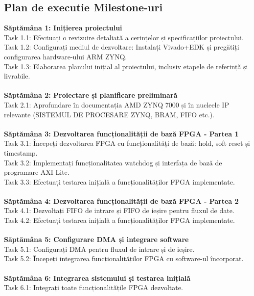 \documentclass[12pt]{article}
\begin{document}
\subsection{Plan de executie Milestone-uri}
\textbf{Săptămâna 1: Inițierea proiectului}\\
Task 1.1: Efectuați o revizuire detaliată a cerințelor și specificațiilor proiectului.\\
Task 1.2: Configurați mediul de dezvoltare: Instalați Vivado+EDK și pregătiți configurarea hardware-ului ARM ZYNQ.\\
Task 1.3: Elaborarea planului inițial al proiectului, inclusiv etapele de referință și livrabile.\\\\
\textbf{Săptămâna 2: Proiectare și planificare preliminară}\\
Task 2.1: Aprofundare în documentația AMD ZYNQ 7000 și în nucleele IP relevante (SISTEMUL DE PROCESARE ZYNQ, BRAM, FIFO etc.).\\\\
\textbf{Săptămâna 3: Dezvoltarea funcționalității de bază FPGA - Partea 1}\\
Task 3.1: Începeți dezvoltarea FPGA cu funcționalități de bază: hold, soft reset și timestamp.\\
Task 3.2: Implementați funcționalitatea watchdog și interfața de bază de programare AXI Lite.\\
Task 3.3: Efectuați testarea inițială a funcționalităților FPGA implementate.\\\\
\textbf{Săptămâna 4: Dezvoltarea funcționalității de bază FPGA - Partea 2}\\
Task 4.1: Dezvoltați FIFO de intrare și FIFO de ieșire pentru fluxul de date.\\
Task 4.2: Efectuați testarea inițială a funcționalităților FPGA implementate.\\\\
\textbf{Săptămâna 5: Configurare DMA și integrare software}\\
Task 5.1: Configurați DMA pentru fluxul de intrare și de ieșire.\\
Task 5.2: Începeți integrarea funcționalităților FPGA cu software-ul încorporat.\\\\
\textbf{Săptămâna 6: Integrarea sistemului și testarea inițială}\\
Task 6.1: Integrați toate funcționalitățile FPGA dezvoltate.\\
\end{document}
